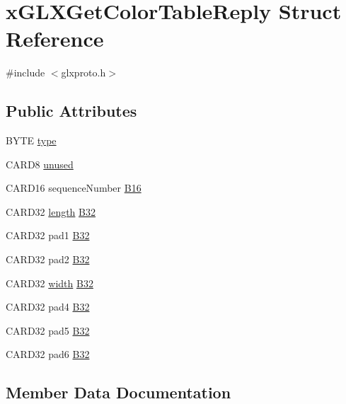 \hypertarget{structx_g_l_x_get_color_table_reply}{}\section{x\+G\+L\+X\+Get\+Color\+Table\+Reply Struct Reference}
\label{structx_g_l_x_get_color_table_reply}


{\ttfamily \#include $<$glxproto.\+h$>$}

\subsection*{Public Attributes}
\begin{DoxyCompactItemize}
\item 
B\+Y\+TE \hyperlink{structx_g_l_x_get_color_table_reply_ac3a618e8ba14c298e7396ebb83675ce4}{type}
\item 
C\+A\+R\+D8 \hyperlink{structx_g_l_x_get_color_table_reply_ac0e2d2b346441c72ebe4db3eb51f0a11}{unused}
\item 
C\+A\+R\+D16 sequence\+Number \hyperlink{structx_g_l_x_get_color_table_reply_a1862f95d93c57e8a9a250983684529e7}{B16}
\item 
C\+A\+R\+D32 \hyperlink{glcorearb_8h_ab9c919755bde3b34349e23a32b4e0fa7}{length} \hyperlink{structx_g_l_x_get_color_table_reply_a0f8a1ce193ea576723df733833634f26}{B32}
\item 
C\+A\+R\+D32 pad1 \hyperlink{structx_g_l_x_get_color_table_reply_aacb7fbc2db39137a3185a14809c02687}{B32}
\item 
C\+A\+R\+D32 pad2 \hyperlink{structx_g_l_x_get_color_table_reply_aade065eb384cb54395990a68d2043371}{B32}
\item 
C\+A\+R\+D32 \hyperlink{gl_8h_a9a82cf3caff84cabc4598e2619faac17}{width} \hyperlink{structx_g_l_x_get_color_table_reply_ac15c2976e2ecbad35051499fe70da0fd}{B32}
\item 
C\+A\+R\+D32 pad4 \hyperlink{structx_g_l_x_get_color_table_reply_ab2ccd83a3ad7f10a63b0247137d44c97}{B32}
\item 
C\+A\+R\+D32 pad5 \hyperlink{structx_g_l_x_get_color_table_reply_a3394f4434c6deec4ba5d91cc084bdb4a}{B32}
\item 
C\+A\+R\+D32 pad6 \hyperlink{structx_g_l_x_get_color_table_reply_a0a6b73883574ff086802ec81ba12548a}{B32}
\end{DoxyCompactItemize}


\subsection{Member Data Documentation}
\mbox{\label{structx_g_l_x_get_color_table_reply_a1862f95d93c57e8a9a250983684529e7}} 
